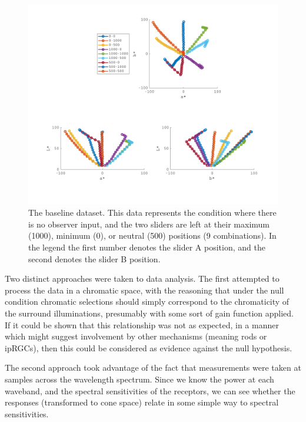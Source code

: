 \begin{figure}[htbp]
\includegraphics[max width=1.2\textwidth, center]{figs/LargeSphere/baselinedataOverview.pdf}
\caption{The baseline dataset. This data represents the condition where there is no observer input, and the two sliders are left at their maximum (1000), minimum (0), or neutral (500) positions (9 combinations). In the legend the first number denotes the slider A position, and the second denotes the slider B position.}
\label{fig:overviewBL}
\end{figure}


Two distinct approaches were taken to data analysis. The first attempted to process the data in a chromatic space, with the reasoning that under the null condition chromatic selections should simply correspond to the chromaticity of the surround illuminations, presumably with some sort of gain function applied. If it could be shown that this relationship was not as expected, in a manner which might suggest involvement by other mechanisms (meaning rods or \glspl{ipRGC}), then this could be considered as evidence against the null hypothesis.

The second approach took advantage of the fact that measurements were taken at samples across the wavelength spectrum. Since we know the power at each waveband, and the spectral sensitivities of the receptors, we can see whether the responses (transformed to cone space) relate in some simple way to spectral sensitivities.

